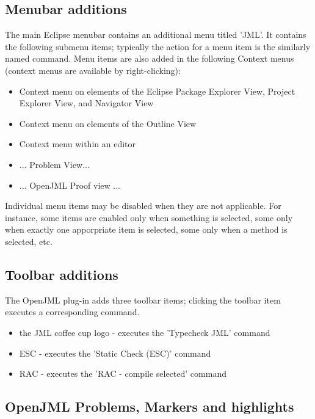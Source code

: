 \subsection{Menubar additions}
The main Eclipse menubar contains an additional menu titled 'JML'. It contains the following submenu items; typically the action for a menu item is the similarly named command.
Menu items are also added in the following Context menus (context menus are available by right-clicking):
\begin{itemize}[noitemsep,nolistsep]
\item Context menu on elements of the Eclipse Package Explorer View, Project Explorer View, and Navigator View
\item Context menu on elements of the Outline View
\item Context menu within an editor
\item ... Problem View...
\item ... OpenJML Proof view ...
\end{itemize}
Individual menu items may be disabled when they are not applicable. For instance, some items are enabled only when something is selected, some only when exactly one apporpriate item is selected, some only when a method is selected, etc.

\subsection{Toolbar additions}
The OpenJML plug-in adds three toolbar items; clicking the toolbar item executes a corresponding command.
\begin{itemize}
\item the JML coffee cup logo - executes the 'Typecheck JML' command
\item ESC - executes the 'Static Check (ESC)' command
\item RAC - executes the 'RAC - compile selected' command
\end{itemize}

\subsection{OpenJML Problems, Markers and highlights}

